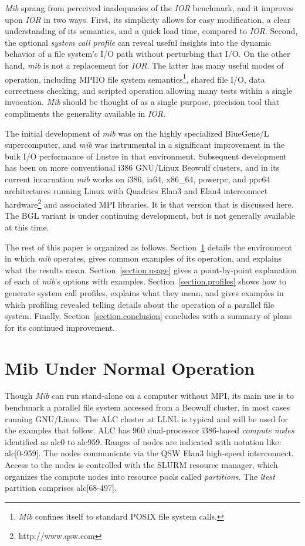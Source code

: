 \documentclass{article}
\begin{document}
{\em Mib} sprang from perceived inadequacies of the {\em IOR}
benchmark, and it improves upon {\em IOR} in two ways.  First, its
simplicity allows for easy modification, a clear understanding of its
semantics, and a quick load time, compared to {\em IOR}.  Second, the
optional {\em system call profile} can reveal useful insights into
the dynamic behavior of a file system's I/O path without perturbing
that I/O.  On the other hand, {\em mib} is not a replacement for {\em
IOR}.  The latter has many useful modes of operation, including MPIIO
file system semantics\footnote{{\em Mib} confines itself to standard POSIX file system calls.}, shared file I/O, data
correctness checking, and scripted operation allowing many tests
within a single invocation.  {\em Mib} should be thought of as a
single purpose, precision tool that compliments the generality
available in {\em IOR}.

The initial development of {\em mib} was on the highly specialized
BlueGene/L supercomputer, and {\em mib} was instrumental in a
significant improvement in the bulk I/O performance of Lustre in that
environment.  Subsequent development has been on more conventional
i386 GNU/Linux Beowulf clusters, and in its current incarnation {\em
  mib} works on i386, ia64, x86\_64, powerpc, and ppc64 architectures
running Linux with Quadrics Elan3 and Elan4 interconnect 
hardware\footnote{http://www.qsw.com} and associated MPI libraries.
It is that version that is discussed here.  The BGL variant is under
continuing development, but is not generally available at this time.

The rest of this paper is organized as follows.
Section~\ref{section.normal} details the environment in which {\em
  mib} operates, gives common examples of its operation, and explains
what the results mean.  Section~\ref{section.usage} gives a
point-by-point explanation of each of {\em mib}'s options with examples.
Section~\ref{section.profiles} shows how to generate system call
profiles, explains what they mean, and gives examples in
which profiling revealed telling details about the operation of a
parallel file system.  Finally, Section~\ref{section.conclusion}
concludes with a summary of plans for its continued improvement.

\section{Mib Under Normal Operation}\label{section.normal}

Though {\em Mib} can run stand-alone on a computer without MPI, its main
use is to benchmark a parallel file system accessed from a Beowulf
cluster, in most cases running GNU/Linux.  The ALC cluster at LLNL is
typical and will be used for the examples that follow.  ALC has 960
dual-processor i386-based {\em compute nodes} identified as alc0 to
alc959.  Ranges of nodes are indicated with notation like: alc[0-959].
The nodes communicate via the QSW Elan3 high-speed interconnect.
Access to the nodes is controlled with the SLURM resource manager,
which organizes the compute nodes into resource pools called {\em
partitions}.  The {\em ltest} partition comprises alc[68-497].
\end{document}

